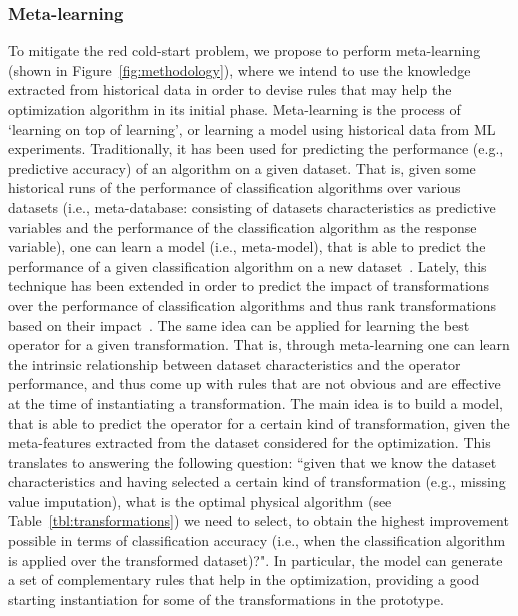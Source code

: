 \subsubsection{Meta-learning}
\color{black}
To mitigate the red cold-start problem, we propose to perform meta-learning (shown in Figure~\ref{fig:methodology}), where we intend to use the knowledge extracted from historical data in order to devise rules that may help the optimization algorithm in its initial phase. 
Meta-learning is the process of `learning on top of learning', or learning a model using historical data from ML experiments. Traditionally, it has been used for predicting the performance (e.g., predictive accuracy) of an algorithm on a given dataset. That is, given some historical runs of the performance of classification algorithms over various datasets (i.e., meta-database: consisting of datasets characteristics as predictive variables and the performance of the classification algorithm as the response variable), one can learn a model (i.e., meta-model), that is able to predict the performance of a given classification algorithm on a new dataset~\cite{Brazdil04Book}. Lately, this technique has been extended in order to predict the impact of transformations over the performance of classification algorithms and thus rank transformations based on their impact~\cite{Bilalli17AMCS, presistant18CSI, presistant19DKE}. The same idea can be applied for learning the best operator for a given transformation.
That is, through meta-learning one can learn the intrinsic relationship between dataset characteristics and the operator performance, and thus come up with rules that are not obvious and are effective at the time of instantiating a transformation. 
The main idea is to build a model, that is able to predict the operator for a certain kind of transformation, given the meta-features extracted from the dataset considered for the optimization. This translates to answering the following question: ``given that we know the dataset characteristics and having selected a certain kind of transformation (e.g., missing value imputation), what is the optimal physical algorithm (see Table~\ref{tbl:transformations}) we need to select, to obtain the highest improvement possible in terms of classification accuracy (i.e., when the classification algorithm is applied over the transformed dataset)?".  In particular, the model can generate a set of complementary rules that help in the optimization, providing a good starting instantiation for some of the transformations in the prototype.

